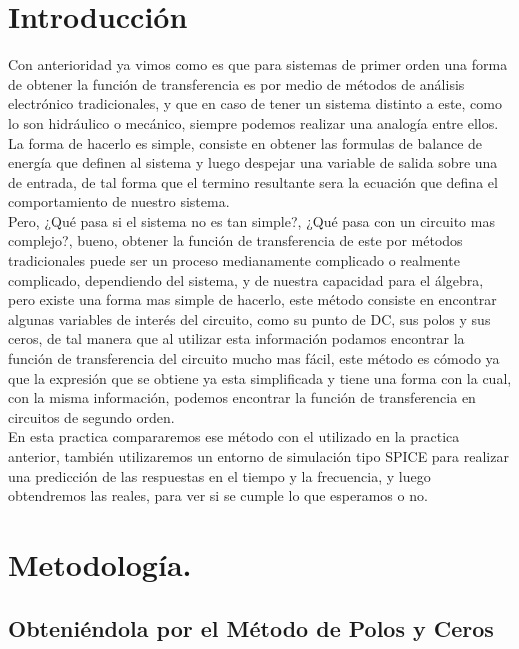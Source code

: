 \documentclass[letterpaper,spanish,12pt]{report}
\begin{document}
\chapter*{Introducci\'on}
Con anterioridad ya vimos como es que para sistemas de primer orden una forma de obtener la funci\'on de transferencia es por medio de m\'etodos de an\'alisis electr\'onico tradicionales, y que en caso de tener un sistema distinto a este, como lo son hidr\'aulico o mec\'anico, siempre podemos realizar una analog\'ia entre ellos. La forma de hacerlo es simple, consiste en obtener las formulas de balance de energ\'ia que definen al sistema y luego despejar una variable de salida sobre una de entrada, de tal forma que el termino resultante sera la ecuaci\'on que defina el comportamiento de nuestro sistema. \\ Pero, ¿Qu\'e pasa si el sistema no es tan simple?, ¿Qu\'e pasa con un circuito mas complejo?, bueno, obtener la funci\'on de transferencia de este por m\'etodos tradicionales puede ser un proceso medianamente complicado o realmente complicado, dependiendo del sistema, y de nuestra capacidad para el \'algebra, pero existe una forma mas simple de hacerlo, este m\'etodo consiste en encontrar algunas variables de inter\'es del circuito, como su punto de DC, sus polos y sus ceros, de tal manera que al utilizar esta informaci\'on podamos encontrar la funci\'on de transferencia del circuito mucho mas f\'acil, este m\'etodo es c\'omodo ya que la expresi\'on que se obtiene ya esta simplificada y tiene una forma con la cual, con la misma informaci\'on, podemos encontrar la funci\'on de transferencia en circuitos de segundo orden. \\ En esta practica compararemos ese m\'etodo con el utilizado en la practica anterior, tambi\'en utilizaremos un entorno de simulaci\'on tipo SPICE para realizar una predicci\'on de las respuestas en el tiempo y la frecuencia, y luego obtendremos las reales, para ver si se cumple lo que esperamos o no.


	\renewcommand{\chaptername}{Parte}

	\chapter{Metodolog\'ia.}

	\section{Obteni\'endola por el M\'etodo de Polos y Ceros}
\end{document}
